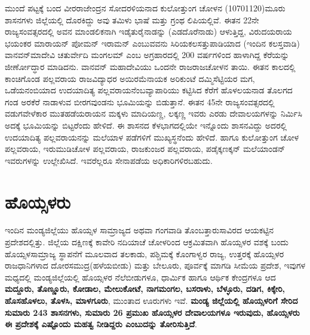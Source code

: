 ಮುಂದೆ ಪಟ್ಟಕ್ಕೆ ಬಂದ ವೀರರಾಜೇಂದ್ರನ ಸೋದರಳಿಯನಾದ ಕುಲೋತ್ತುಂಗ ಚೋಳನ (1070\enginline{-}1120)ಮೂರು ಶಾಸನಗಳು ಜಿಲ್ಲೆಯಲ್ಲಿ ದೊರಕಿದ್ದು ಅವು ತಮಿಳು ಭಾಷೆ ಮತ್ತು ಗ್ರಂಥ ಲಿಪಿಯಲ್ಲಿವೆ. ಈತನ 22ನೇ ರಾಜ್ಯಸಂವತ್ಸರದಲ್ಲಿ ಅವನ ಮಾಂಡಲಿಕನಾಗಿ ಇಡೈತುರೈನಾಡನ್ನು (ಎಡದೊರೆನಾಡು) ಆಳುತ್ತಿದ್ದ, ವಿರುದಯರಾಯ ಭಯಂಕರ ಮಾರಾಯನ್​ ಪೋಮನ್​ ಇರಾಮನ್​ ಎಂಬುವವನು ಸಿರಿಯಕಲಸತ್ತುಪಾಡಿಯಾದ (ಇಂದಿನ ಕಲಸ್ತವಾಡಿ) ವಾನವನ್​ಮಾದೇವಿ ಚತುರ್ವೇದಿ ಮಂಗಲಮ್ ಎಂಬ ಅಗ್ರಹಾರದಲ್ಲಿ 200 ವರ್ಷಗಳಿಂದ ಹಾಳಾಗಿದ್ದ ಕೆರೆಯನ್ನು ಜೀರ್ಣೋದ್ಧಾರ ಮಾಡಿದನು. ವಾನವನ್​ ಮಹಾದೇವಿಯು ಒಂದನೇ ರಾಜರಾಜಚೋಳನ ತಾಯಿ. ಈತನ ಕಾಲದಲ್ಲಿ ಕಾಂಚಿಗೊಂಡ ಪಲ್ಲವರಾಯ ರಾಜವಿದ್ಯಾಧರ ಅಯಿರಮೆನಾಯಕ ಅರಿಕುಂಟೆ ದಮ್ಮಿಸೆಟ್ಟಿಯರ ಮಗ, ಒಡೆಯನಂಬಿಯಾದ ಉದಯಾದಿತ್ಯ ಪಲ್ಲವರಾಯನೆಂಬ\break ವ್ಯಾಪಾರಿಯು ಕಟ್ಟಿಸಿದ ಕೆರೆಗೆ ಹೊಳಲಯನಾಡ ತೊಲಗದ ಗಂಡ ಅರಕೆರೆ ನಾಡಾಳುವ ಬೀರಗವುಂಡನು ಭೂಮಿಯನ್ನು ಬಿಡುತ್ತಾನೆ. ಈತನ 45ನೇ ರಾಜ್ಯಸಂವತ್ಸರದಲ್ಲಿ ವಡುಗವೇಳೆಕಾರ ಮುತಹಡೆಯರಾಯನ ಮಕ್ಕಳು ಮಾದಿಯಣ್ಣ, ಲಕ್ಕಣ್ಣ ಇವರು ಎರಡು ದೇವಾಲಯಗಳನ್ನು ನಿರ್ಮಿಸಿ ಅದಕ್ಕೆ ಭೂಮಿಯನ್ನು ಬಿಟ್ಟರೆಂದು ಹೇಳಿದೆ. ಈ ಶಾಸನದ ಕೆಳಭಾಗದಲ್ಲಿಯೇ ಇನ್ನೊಂದು ಶಾಸನವಿದ್ದು ಅದರಲ್ಲಿ ಉದಯಾದಿತ್ಯ ಪಲ್ಲವರಾಯನನ್ನು ಮಲೆಯಾಳ ಪಡೆಗಳಿಗೆ ಮುಖ್ಯಸ್ಥನೆಂದು ಹೇಳಿದೆ. ಹಾಗೂ ಕುಲೋತ್ತುಂಗ ಚೋಳ ಪಲ್ಲವರಾಯ, ಇರುಮುಡಿಚೋಳ ಪಲ್ಲವರಾಯ, ರಾಜಕುಂಜರ ಪಲ್ಲವರಾಯ, ಪಡೈಕ್ಕಣಕ್ಕನ್​ ಮಲೆಯಾಂಡನ್​ ಇವರುಗಳನ್ನು ಉಲ್ಲೇಖಿಸಿದೆ. ಇವರೆಲ್ಲರೂ ಸೇನಾಪಡೆಯ ಅಧಿಕಾರಿಗಳಿರಬಹುದು.


\section{ಹೊಯ್ಸಳರು}

ಇಂದಿನ ಮಂಡ್ಯಜಿಲ್ಲೆಯು ಹೊಯ್ಸಳ ಸಾಮ್ರಾಜ್ಯದ ಅಥವಾ ಗಂಗವಾಡಿ ತೊಂಬತ್ತಾರುಸಾವಿರದ ಆಯಕಟ್ಟಿನ ಪ್ರದೇಶದಲ್ಲಿತ್ತು. ಜಿಲ್ಲೆಯ ದಕ್ಷಿಣಕ್ಕೆ ಕಾವೇರಿ ನದಿಯಾಚೆ ಚೋಳರಿಂದ ಆಕ್ರಮಿತವಾಗಿ ಹೊಯ್ಸಳರ ವಶಕ್ಕೆ ಬಂದು ಹೊಯ್ಸಳಸಾಮ್ರಾಜ್ಯ ಸ್ಥಾಪನೆಗೆ ಮೂಲವಾದ ತಲಕಾಡು, ಪಶ್ಚಿಮಕ್ಕೆ ಕೊಂಗಾಳ್ವರ ರಾಜ್ಯ, ಉತ್ತರಕ್ಕೆ ಹೊಯ್ಸಳರ ರಾಜಧಾನಿಗಳಾದ ದೋರಸಮುದ್ರ\break (ಹಳೆಯಬೀಡು) ಮತ್ತು ಬೇಲೂರು, ಪೂರ್ವಕ್ಕೆ ಮಾಗಡಿ ಸೀಮೆಯ ಪ್ರದೇಶ, ಇವುಗಳ ಮಧ್ಯದಲ್ಲಿ ಮಂಡ್ಯಜಿಲ್ಲೆಯಲ್ಲಿ ಹೊಯ್ಸಳರ ನೆಲೆಬೀಡುಗಳೂ, ಧಾರ್ಮಿಕ ಹಾಗೂ ಆರ್ಥಿಕ ಕೇಂದ್ರಗಳೂ ಆದ \textbf{ಮದ್ದೂರು, ತೊಣ್ಣೂರು, ಕೋಡಾಲ, ಮೇಲುಕೋಟೆ, ನಾಗಮಂಗಲ, ಬಸರಾಳು, ಬೆಳ್ಳೂರು, ದಡಿಗ, ಕಿಕ್ಕೇರಿ, ಹೊಸಹೊಳಲು, ತೊಳಸಿ, ಮಾಳಗೂರು}, ಮುಂತಾದ ಊರುಗಳು ಇವೆ. \textbf{ಮಂಡ್ಯ ಜಿಲ್ಲೆಯಲ್ಲಿ ಹೊಯ್ಸಳರಿಗೆ ಸೇರಿದ ಸುಮಾರು 243 ಶಾಸನಗಳು, ಸುಮಾರು 26 ಪ್ರಮುಖ ಹೊಯ್ಸಳರ ದೇವಾಲಯಗಳೂ ಇರುವುದು, ಹೊಯ್ಸಳರು ಈ ಪ್ರದೇಶಕ್ಕೆ ಎಷ್ಟೊಂದು ಮಹತ್ವ ನೀಡಿದ್ದರು ಎಂಬುದನ್ನು ತೋರಿಸುತ್ತಿದೆ}.

